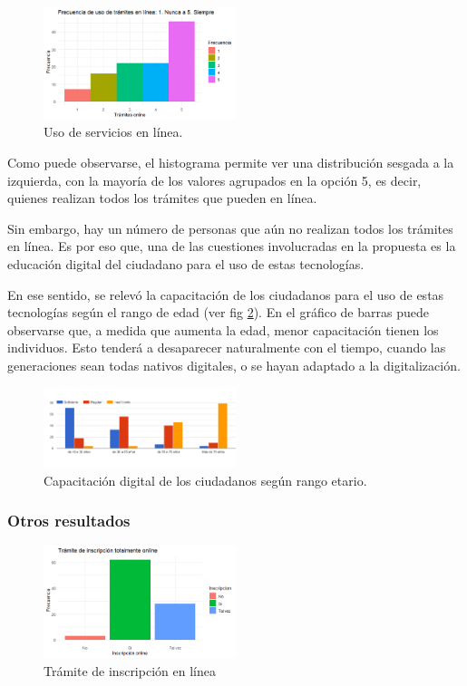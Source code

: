\documentclass[a4paper]{article}
\begin{document}
\begin{figure}
\centering
\includegraphics[width=0.5\textwidth]{Imagen3.png}
\caption{\label{fig:Imagen3}Uso de servicios en línea.}
\end{figure}

Como puede observarse, el histograma permite ver una distribución sesgada a la izquierda, con la mayoría de los valores agrupados en la opción 5, es decir, quienes realizan todos los trámites que pueden en línea. 

Sin embargo, hay un número de personas que aún no realizan todos los trámites en línea. Es por eso que, una de las cuestiones involucradas en la propuesta es la educación digital del ciudadano para el uso de estas tecnologías. 

En ese sentido, se relevó la capacitación de los ciudadanos para el uso de estas tecnologías según el rango de edad (ver fig \ref{fig:Imagen4}). En el gráfico de barras puede observarse que, a medida que aumenta la edad, menor capacitación tienen los individuos. Esto tenderá a desaparecer naturalmente con el tiempo, cuando las generaciones sean todas nativos digitales, o se hayan adaptado a la digitalización.

\begin{figure}
\centering
\includegraphics[width=0.5\textwidth]{Imagen4.png}
\caption{\label{fig:Imagen4}Capacitación digital de los ciudadanos según rango etario.}
\end{figure}

\subsubsection{Otros resultados}
\begin{figure}
\centering
\includegraphics[width=0.5\textwidth]{Imagen5.png}
\caption{\label{fig:Imagen5}Trámite de inscripción en línea}
\end{figure}
\end{document}
